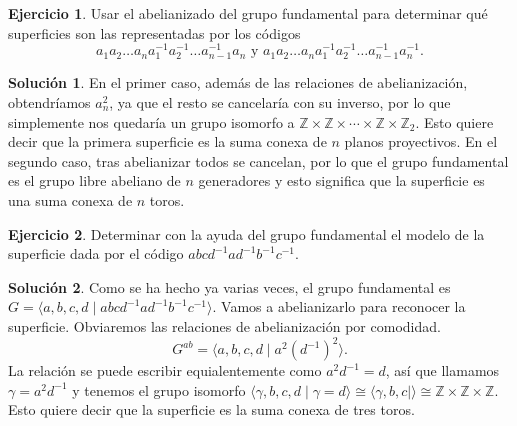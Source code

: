 \documentclass{article}
\theoremstyle{plain}
\theoremstyle{definition}
\newtheorem{exercise}{Ejercicio}
\newtheorem*{sol*}{Solución}
\newcommand{\Z}{\mathbb{Z}}
\begin{document}
\begin{exercise}
Usar el abelianizado del grupo fundamental para determinar qu\'e superficies son las representadas por los c\'odigos
$$
a_1a_2\dots a_n a^{-1}_1a^{-1}_2\dots a^{-1}_{n-1}a_n \mbox{ y } a_1a_2\dots a_na^{-1}_1a^{-1}_2\dots a^{-1}_{n-1}a^{-1}_n.
$$
\end{exercise}
\begin{sol*}
En el primer caso, además de las relaciones de abelianización, obtendríamos $a_n^2$, ya que el resto se cancelaría con su inverso, por lo que simplemente nos quedaría un grupo isomorfo a $\Z\times\Z\times\cdots\times\Z\times\Z_2$. Esto quiere decir que la primera superficie es la suma conexa de $n$ planos proyectivos. En el segundo caso, tras abelianizar todos se cancelan, por lo que el grupo fundamental es el grupo libre abeliano de $n$ generadores y esto significa que la superficie es una suma conexa de $n$ toros.
\end{sol*}

\newpage

\begin{exercise}
Determinar con la ayuda del grupo fundamental el modelo de la superficie dada por  el c\'odigo $abcd^{-1}ad^{-1}b^{-1}c^{-1}$.
\end{exercise}
\begin{sol*}
Como se ha hecho ya varias veces, el grupo fundamental es $G=\langle a,b,c,d\mid abcd^{-1}ad^{-1}b^{-1}c^{-1}\rangle$. Vamos a abelianizarlo para reconocer la superficie. Obviaremos las relaciones de abelianización por comodidad.
\[
G^{ab}=\langle a,b,c,d\mid a^2(d^{-1})^2\rangle.
\]
La relación se puede escribir equialentemente como $a^2d^{-1}=d$, así que llamamos $\gamma= a^2d^{-1}$ y tenemos el grupo isomorfo $\langle \gamma,b,c,d\mid \gamma =d\rangle\cong\langle\gamma,b,c\mid\rangle\cong\Z\times\Z\times\Z$. Esto quiere decir que la superficie es la suma conexa de tres toros.
\end{sol*}
\end{document}
